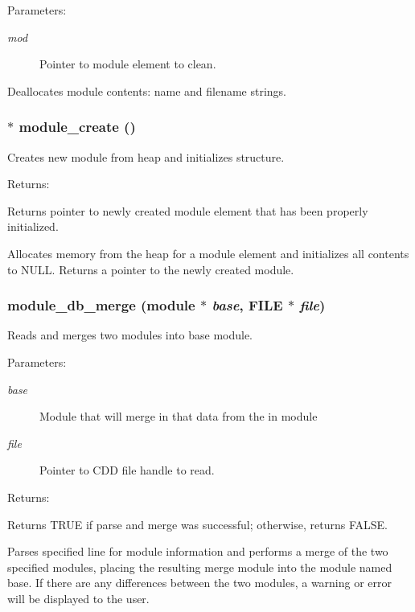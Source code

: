 \begin{Desc}
\item[Parameters: ]\par
\begin{description}
\item[{\em 
mod}]Pointer to module element to clean.\end{description}
\end{Desc}
Deallocates module contents: name and filename strings. 
\subsubsection{$\ast$ module\_\-create ()}\label{module_8c_a1}


Creates new module from heap and initializes structure.

\begin{Desc}
\item[Returns: ]\par
Returns pointer to newly created module element that has been properly initialized.\end{Desc}
Allocates memory from the heap for a module element and initializes all contents to NULL. Returns a pointer to the newly created module. 
\subsubsection{ module\_\-db\_\-merge ({\bf module} $\ast$ {\em base}, FILE $\ast$ {\em file})}\label{module_8c_a4}


Reads and merges two modules into base module.

\begin{Desc}
\item[Parameters: ]\par
\begin{description}
\item[{\em 
base}]Module that will merge in that data from the in module \item[{\em 
file}]Pointer to CDD file handle to read.\end{description}
\end{Desc}
\begin{Desc}
\item[Returns: ]\par
Returns TRUE if parse and merge was successful; otherwise, returns FALSE.\end{Desc}
Parses specified line for module information and performs a merge of the two  specified modules, placing the resulting merge module into the module named base. If there are any differences between the two modules, a warning or error will be displayed to the user. 
